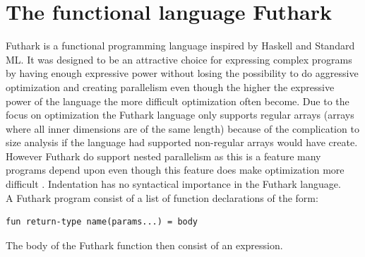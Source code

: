 \documentclass[11pt]{article}
\begin{document}

 


\newpage

\section{The functional language Futhark}

Futhark is a functional programming language inspired by Haskell and Standard ML.
It was designed to be an attractive choice for expressing complex programs by having enough expressive power without
losing the possibility to do aggressive optimization and creating parallelism even though the higher the expressive power of the
language the more difficult optimization often become.
Due to the focus on optimization the Futhark language only supports regular arrays
(arrays where all inner dimensions are of the same length)
because of the complication to size analysis if the language had supported non-regular arrays would have create.
However Futhark do support nested parallelism as this is a feature many programs 
depend upon even though this feature does make optimization more difficult \cite{TroelsHenriksen}.
Indentation has no syntactical importance in the Futhark language. \\



A Futhark program consist of a list of function declarations of the form:
\begin{lstlisting}[numbers=none,frame=none]
fun return-type name(params...) = body
\end{lstlisting}
The body of the Futhark function then consist of an expression. 
\end{document}
